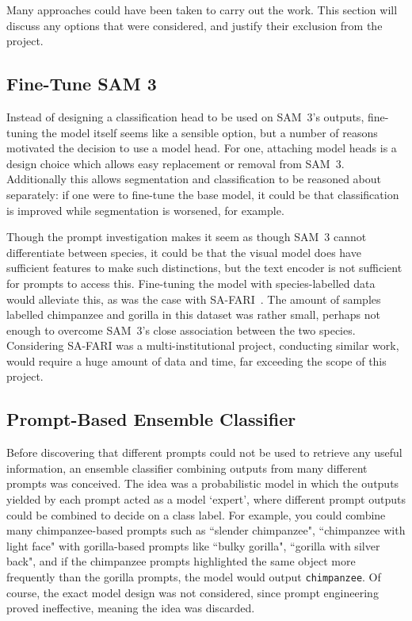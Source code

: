 \documentclass[author={Jacob Stephenson},
    degree={BSc},
    title={Robust Great Ape Species Detection in Wild Camera Trap Imagery with Promptable Concept Segmentation},
    unit={COMS30045},
    subtitle={}]{dissertation}
\begin{document}
Many approaches could have been taken to carry out the work. This section will discuss any options that were considered, and justify their exclusion from the project.


\subsection{Fine-Tune SAM 3}

Instead of designing a classification head to be used on SAM~3's outputs, fine-tuning the model itself seems like a sensible option, but a number of reasons motivated the decision to use a model head. For one, attaching model heads is a design choice which allows easy replacement or removal from SAM~3. Additionally this allows segmentation and classification to be reasoned about separately: if one were to fine-tune the base model, it could be that classification is improved while segmentation is worsened, for example.

Though the prompt investigation makes it seem as though SAM~3 cannot differentiate between species, it could be that the visual model does have sufficient features to make such distinctions, but the text encoder is not sufficient for prompts to access this. Fine-tuning the model with species-labelled data would alleviate this, as was the case with SA-FARI~\cite{wasmuht2025safaridatasetsegmentfootage}. The amount of samples labelled chimpanzee and gorilla in this dataset was rather small, perhaps not enough to overcome SAM~3's close association between the two species. Considering SA-FARI was a multi-institutional project, conducting similar work, would require a huge amount of data and time, far exceeding the scope of this project.




\subsection{Prompt-Based Ensemble Classifier}

Before discovering that different prompts could not be used to retrieve any useful information, an ensemble classifier combining outputs from many different prompts was conceived. The idea was a probabilistic model in which the outputs yielded by each prompt acted as a model `expert', where different prompt outputs could be combined to decide on a class label. For example, you could combine many chimpanzee-based prompts such as ``slender chimpanzee", ``chimpanzee with light face" with gorilla-based prompts like ``bulky gorilla", ``gorilla with silver back", and if the chimpanzee prompts highlighted the same object more frequently than the gorilla prompts, the model would output \texttt{chimpanzee}. Of course, the exact model design was not considered, since prompt engineering proved ineffective, meaning the idea was discarded.
\end{document}
